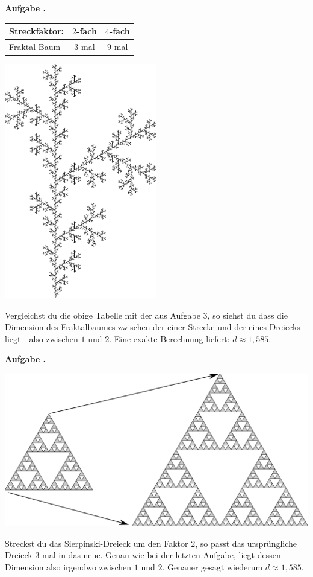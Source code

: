 \documentclass[a4paper,ngerman,12pt]{scrartcl}
\theoremstyle{definition}
\theoremstyle{plain}
\theoremstyle{remark}
\newlength{\aufgabenskip}
\newcounter{aufgabennummer}
\newenvironment{aufgabe}[1]{
  \addtocounter{aufgabennummer}{1}
  \textbf{Aufgabe \theaufgabennummer.} \emph{#1} \par
}{\vspace{\aufgabenskip}}
\begin{document}
\begin{aufgabe}{}
	\begin{minipage}{\textwidth}
		\begin{minipage}[t]{0.7\textwidth}
			\renewcommand{\arraystretch}{2}
			\begin{center}
				\begin{tabular}{l||c|c}
				Streckfaktor:& $2$-fach & $4$-fach \\\hline\hline
				Fraktal-Baum & $3$-mal & $9$-mal \\	
			\end{tabular}
			\end{center}
		\end{minipage}
		\begin{minipage}[t]{0.2\textwidth}\vspace{-1.5cm}
			\includegraphics[width=0.5\textwidth]{Bilder/Baum.pdf}
		\end{minipage}
	\end{minipage}
	
	Vergleichst du die obige Tabelle mit der aus Aufgabe 3, so siehst du dass die Dimension des Fraktalbaumes zwischen der einer Strecke und der eines Dreiecks liegt - also zwischen $1$ und $2$. Eine exakte Berechnung liefert: $d \approx 1,585$.
\end{aufgabe}

\newpage
\begin{aufgabe}{}\label{aufgabe:Sierpinski-Flaeche}
	\begin{center}
		\includegraphics[width=.5\textwidth]{Bilder/Sierpinski-Dreieck-Vergroessern.pdf}
	\end{center}
	Streckst du das Sierpinski-Dreieck um den Faktor $2$, so passt das ursprüngliche Dreieck $3$-mal in das neue. Genau wie bei der letzten Aufgabe, liegt dessen Dimension also irgendwo zwischen $1$ und $2$. Genauer gesagt wiederum $d \approx 1,585$.
\end{aufgabe}
\end{document}
